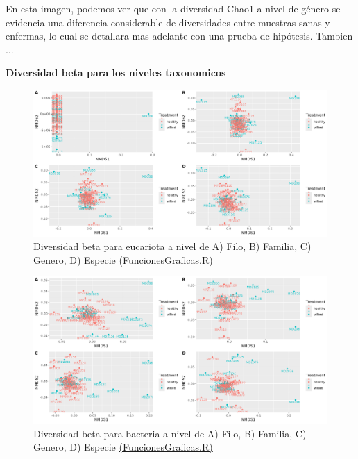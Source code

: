 En esta imagen, podemos ver que con la diversidad Chao1 a nivel de género se evidencia una diferencia considerable de diversidades entre muestras sanas y enfermas, lo cual se detallara mas adelante con una prueba de hipótesis. Tambien ...

\textbf{Diversidad beta para los niveles taxonomicos}

\begin{figure}[h]
\centering
\includegraphics[width=\textwidth]{Img/cap2/Beta_Eukarya.png}
\caption{Diversidad beta para eucariota a nivel de A) Filo, B) Familia, C) Genero, D) Especie \href{https://github.com/CamilaSilva1995/Tesis_Maestria/blob/main/Analisis_Comparativo/Fresa_Solena/20230227_Funciones&Graficas.R}{(FuncionesGraficas.R)}}
\end{figure}

\begin{figure}[h]
\centering
\includegraphics[width=\textwidth]{Img/cap2/Beta_Bacteria.png}
\caption{Diversidad beta para bacteria a nivel de A) Filo, B) Familia, C) Genero, D) Especie \href{https://github.com/CamilaSilva1995/Tesis_Maestria/blob/main/Analisis_Comparativo/Fresa_Solena/20230227_Funciones&Graficas.R}{(FuncionesGraficas.R)}}
\end{figure}


